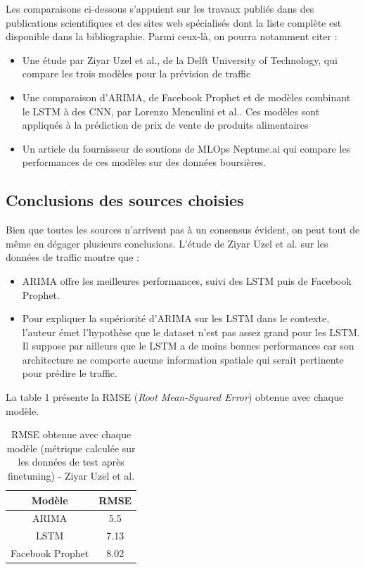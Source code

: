 \documentclass[french]{article}
\begin{document}
    Les comparaisons ci-dessous s'appuient sur les travaux publiés dans des publications scientifiques et des sites web spécialisés dont la liste complète est disponible dans la bibliographie. Parmi ceux-là, on pourra notamment citer :
    \begin{itemize}
        \item Une étude par Ziyar Uzel et al., de la Delft University of Technology\cite{uzel}, qui compare les trois modèles pour la prévision de traffic 
        \item Une comparaison d'ARIMA, de Facebook Prophet et de modèles combinant le LSTM à des CNN, par Lorenzo Menculini et al.\cite{menculini}. Ces modèles sont appliqués à la prédiction de prix de vente de produits alimentaires
        \item Un article du fournisseur de soutions de MLOps Neptune.ai\cite{neptune} qui compare les performances de ces modèles sur des données boursières.
    \end{itemize}

    \subsection{Conclusions des sources choisies}
    Bien que toutes les sources n'arrivent pas à un consensus évident, on peut tout de même en dégager plusieurs conclusions.
    L'étude de Ziyar Uzel et al.\cite{uzel} sur les données de traffic montre que :
    \begin{itemize}
        \item ARIMA offre les meilleures performances, suivi des LSTM puis de Facebook Prophet.
        \item Pour expliquer la supériorité d'ARIMA sur les LSTM dans le contexte, l'auteur émet l'hypothèse que le dataset n'est pas assez grand pour les LSTM. Il suppose par ailleurs que le LSTM a de moins bonnes performances car son architecture ne comporte aucune information spatiale qui serait pertinente pour prédire le traffic.
    \end{itemize}
    La table 1 présente la RMSE (\textit{Root Mean-Squared Error}) obtenue avec chaque modèle.
    \begin{table}[h!]
        \begin{center}
            \begin{tabular}{ |c|c| }
                \hline
                Modèle & RMSE \\
                \hline
                ARIMA & 5.5 \\ 
                \hline
                LSTM & 7.13 \\  
                \hline
                Facebook Prophet & 8.02 \\
                \hline
            \end{tabular}
            \caption{RMSE obtenue avec chaque modèle (métrique calculée sur les données de test après finetuning) - Ziyar Uzel et al.}
            \label{table:1}
        \end{center}
    \end{table}
    
\end{document}
